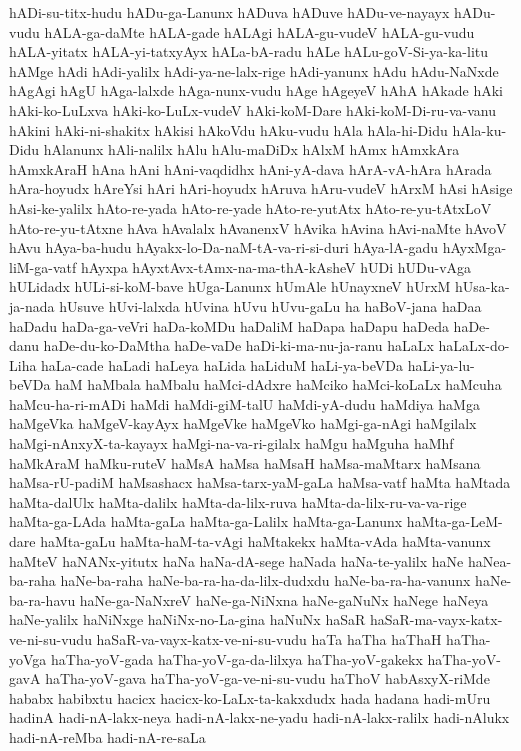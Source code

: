 {hADi-su-titx-hudu
hADu-ga-Lanunx
hADuva
hADuve
hADu-ve-nayayx
hADu-vudu
hALA-ga-daMte
hALA-gade
hALAgi
hALA-gu-vudeV
hALA-gu-vudu
hALA-yitatx
hALA-yi-tatxyAyx
hALa-bA-radu
hALe
hALu-goV-Si-ya-ka-litu
hAMge
hAdi
hAdi-yalilx
hAdi-ya-ne-lalx-rige
hAdi-yanunx
hAdu
hAdu-NaNxde
hAgAgi
hAgU
hAga-lalxde
hAga-nunx-vudu
hAge
hAgeyeV
hAhA
hAkade
hAki
hAki-ko-LuLxva
hAki-ko-LuLx-vudeV
hAki-koM-Dare
hAki-koM-Di-ru-va-vanu
hAkini
hAki-ni-shakitx
hAkisi
hAkoVdu
hAku-vudu
hAla
hAla-hi-Didu
hAla-ku-Didu
hAlanunx
hAli-nalilx
hAlu
hAlu-maDiDx
hAlxM
hAmx
hAmxkAra
hAmxkAraH
hAna
hAni
hAni-vaqdidhx
hAni-yA-dava
hArA-vA-hAra
hArada
hAra-hoyudx
hAreYsi
hAri
hAri-hoyudx
hAruva
hAru-vudeV
hArxM
hAsi
hAsige
hAsi-ke-yalilx
hAto-re-yada
hAto-re-yade
hAto-re-yutAtx
hAto-re-yu-tAtxLoV
hAto-re-yu-tAtxne
hAva
hAvalalx
hAvanenxV
hAvika
hAvina
hAvi-naMte
hAvoV
hAvu
hAya-ba-hudu
hAyakx-lo-Da-naM-tA-va-ri-si-duri
hAya-lA-gadu
hAyxMga-liM-ga-vatf
hAyxpa
hAyxtAvx-tAmx-na-ma-thA-kAsheV
hUDi
hUDu-vAga
hULidadx
hULi-si-koM-bave
hUga-Lanunx
hUmAle
hUnayxneV
hUrxM
hUsa-ka-ja-nada
hUsuve
hUvi-lalxda
hUvina
hUvu
hUvu-gaLu
ha
haBoV-jana
haDaa
haDadu
haDa-ga-veVri
haDa-koMDu
haDaliM
haDapa
haDapu
haDeda
haDe-danu
haDe-du-ko-DaMtha
haDe-vaDe
haDi-ki-ma-nu-ja-ranu
haLaLx
haLaLx-do-Liha
haLa-cade
haLadi
haLeya
haLida
haLiduM
haLi-ya-beVDa
haLi-ya-lu-beVDa
haM
haMbala
haMbalu
haMci-dAdxre
haMciko
haMci-koLaLx
haMcuha
haMcu-ha-ri-mADi
haMdi
haMdi-giM-talU
haMdi-yA-dudu
haMdiya
haMga
haMgeVka
haMgeV-kayAyx
haMgeVke
haMgeVko
haMgi-ga-nAgi
haMgilalx
haMgi-nAnxyX-ta-kayayx
haMgi-na-va-ri-gilalx
haMgu
haMguha
haMhf
haMkAraM
haMku-ruteV
haMsA
haMsa
haMsaH
haMsa-maMtarx
haMsana
haMsa-rU-padiM
haMsashacx
haMsa-tarx-yaM-gaLa
haMsa-vatf
haMta
haMtada
haMta-dalUlx
haMta-dalilx
haMta-da-lilx-ruva
haMta-da-lilx-ru-va-va-rige
haMta-ga-LAda
haMta-gaLa
haMta-ga-Lalilx
haMta-ga-Lanunx
haMta-ga-LeM-dare
haMta-gaLu
haMta-haM-ta-vAgi
haMtakekx
haMta-vAda
haMta-vanunx
haMteV
haNANx-yitutx
haNa
haNa-dA-sege
haNada
haNa-te-yalilx
haNe
haNea-ba-raha
haNe-ba-raha
haNe-ba-ra-ha-da-lilx-dudxdu
haNe-ba-ra-ha-vanunx
haNe-ba-ra-havu
haNe-ga-NaNxreV
haNe-ga-NiNxna
haNe-gaNuNx
haNege
haNeya
haNe-yalilx
haNiNxge
haNiNx-no-La-gina
haNuNx
haSaR
haSaR-ma-vayx-katx-ve-ni-su-vudu
haSaR-va-vayx-katx-ve-ni-su-vudu
haTa
haTha
haThaH
haTha-yoVga
haTha-yoV-gada
haTha-yoV-ga-da-lilxya
haTha-yoV-gakekx
haTha-yoV-gavA
haTha-yoV-gava
haTha-yoV-ga-ve-ni-su-vudu
haThoV
habAsxyX-riMde
hababx
habibxtu
hacicx
hacicx-ko-LaLx-ta-kakxdudx
hada
hadana
hadi-mUru
hadinA
hadi-nA-lakx-neya
hadi-nA-lakx-ne-yadu
hadi-nA-lakx-ralilx
hadi-nAlukx
hadi-nA-reMba
hadi-nA-re-saLa
}
